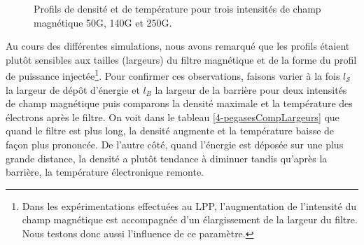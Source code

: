\begin{refsection}
\begin{figure}[!htbp]
  \centering
    \caption{Profils de densité  et de
    température  pour trois intensités de
    champ magnétique 50G, 140G et 250G.}
    \label{4-pegasesCompMagProfile}
\end{figure}

Au cours des différentes simulations, nous avons remarqué que les profils
étaient plutôt sensibles aux tailles (largeurs) du filtre magnétique et de la
forme du profil de puissance injectée\footnote{Dans les expérimentations
effectuées au LPP, l'augmentation de l'intensité du champ magnétique est accompagnée d'un
élargissement de la largeur du filtre. Nous testons donc aussi l'influence de
ce paramètre.}.
Pour confirmer ces observations, faisons varier à la fois $l_\mathcal{S}$ la
largeur de dépôt d'énergie et $l_B$ la largeur de la barrière pour deux intensités de
champ magnétique puis comparons la densité maximale et la température des
électrons après le filtre. On voit dans le tableau \ref{4-pegasesCompLargeurs}
que quand le filtre est plus long, la densité augmente et la température baisse
de façon plus prononcée.
De l'autre côté, quand l'énergie est déposée sur une plus grande distance, la
densité a plutôt tendance à diminuer tandis qu'après la barrière, la
température électronique remonte.


\end{refsection}
